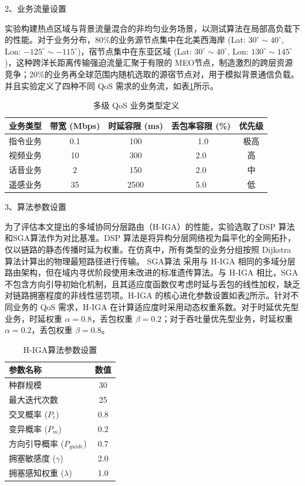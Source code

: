 \documentclass[print, master, vlined]{DissertUESTC}
\begin{document}
    2、业务流量设置
    
    实验构建热点区域与背景流量混合的非均匀业务场景，以测试算法在局部高负载下的性能。对于业务分布，80\%的业务源节点集中在北美西海岸 (Lat: $30^{\circ}\sim40^{\circ}$, Lon: $-125^{\circ}\sim-115^{\circ}$)，宿节点集中在东亚区域 (Lat: $30^{\circ}\sim40^{\circ}$, Lon: $130^{\circ}\sim145^{\circ}$)，这种跨洋长距离传输强迫流量汇聚于有限的 MEO节点，制造激烈的跨层资源竞争；20\%的业务再全球范围内随机选取的源宿节点对，用于模拟背景通信负载。并且实验定义了四种不同 QoS 需求的业务流，如表\ref{tab: 多级 QoS 业务类型定义}所示。
    \begin{table}[htbp]
        \caption{多级 QoS 业务类型定义}
        \centering
        \begin{tabular}{lcccc}
        \toprule
        \textbf{业务类型} & \textbf{带宽 (Mbps)} & \textbf{时延容限 (ms)} & \textbf{丢包率容限 (\%)} & \textbf{优先级} \\
        \midrule
        指令业务  & 0.1 & 100 & \ 1.0 & 极高 \\
        视频业务  & 10 & 300 & 2.0 & 高 \\
        话音业务  & 2 & 150 & 2.0 & 中 \\
        遥感业务  &  35 & 2500 & 5.0 & 低 \\
        \bottomrule
        \end{tabular}
        \label{tab: 多级 QoS 业务类型定义}
    \end{table}

    3、算法参数设置

    为了评估本文提出的多域协同分层路由（H-IGA）的性能，实验选取了DSP 算法和SGA算法作为对比基准。DSP 算法是将异构分层网络视为扁平化的全网拓扑，仅以链路的静态传播时延为权重。在仿真中，所有类型的业务分组按照 Dijkstra 算法计算出的物理最短路径进行传输。 SGA算法 采用与 H-IGA 相同的多域分层路由架构，但在域内寻优阶段使用未改进的标准遗传算法。与 H-IGA 相比，SGA 不包含方向引导初始化机制，且其适应度函数仅考虑时延与丢包的线性加权，缺乏对链路拥塞程度的非线性惩罚项。H-IGA 的核心进化参数设置如表\ref{tab: H-IGA算法参数设置}所示。针对不同业务的 QoS 需求，H-IGA 在计算适应度时采用动态权重系数。对于时延优先型业务，时延权重 $\alpha=0.8$，丢包权重 $\beta=0.2$；对于吞吐量优先型业务，时延权重 $\alpha=0.2$，丢包权重 $\beta=0.8$。
    \begin{table}[htbp]
      \caption{H-IGA算法参数设置}
      \centering
      \begin{tabular}{lc}
        \toprule
        \textbf{参数名称} & \textbf{数值} \\
        \midrule
        种群规模  & 30 \\
        最大迭代次数 & 25 \\
        交叉概率 ($P_c$) & 0.8 \\
        变异概率 ($P_m$) & 0.2 \\
        方向引导概率 ($P_{guide}$) & 0.7 \\
        拥塞敏感度 ($\gamma$) & 2.0 \\
        拥塞感知权重 ($\lambda$) & 1.0 \\
        \bottomrule
      \end{tabular}
      \label{tab: H-IGA算法参数设置}
    \end{table}
\end{document}
